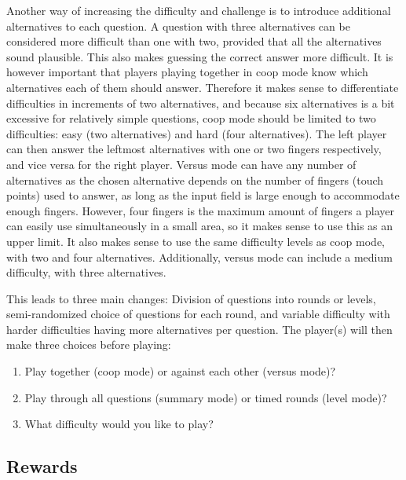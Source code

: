 Another way of increasing the difficulty and challenge is to introduce additional alternatives to each question. A question with three alternatives can be considered more difficult than one with two, provided that all the alternatives sound plausible. This also makes guessing the correct answer more difficult. It is however important that players playing together in coop mode know which alternatives each of them should answer. Therefore it makes sense to differentiate difficulties in increments of two alternatives, and because six alternatives is a bit excessive for relatively simple questions, coop mode should be limited to two difficulties: easy (two alternatives) and hard (four alternatives). The left player can then answer the leftmost alternatives with one or two fingers respectively, and vice versa for the right player. Versus mode can have any number of alternatives as the chosen alternative depends on the number of fingers (touch points) used to answer, as long as the input field is large enough to accommodate enough fingers. However, four fingers is the maximum amount of fingers a player can easily use simultaneously in a small area, so it makes sense to use this as an upper limit. It also makes sense to use the same difficulty levels as coop mode, with two and four alternatives. Additionally, versus mode can include a medium difficulty, with three alternatives.

This leads to three main changes: Division of questions into rounds or levels, semi-randomized choice of questions for each round, and variable difficulty with harder difficulties having more alternatives per question. The player(s) will then make three choices before playing:
\begin{enumerate}
	\item Play together (coop mode) or against each other (versus mode)?
	\item Play through all questions (summary mode) or timed rounds (level mode)?
	\item What difficulty would you like to play?
\end{enumerate}


\subsection{Rewards}

